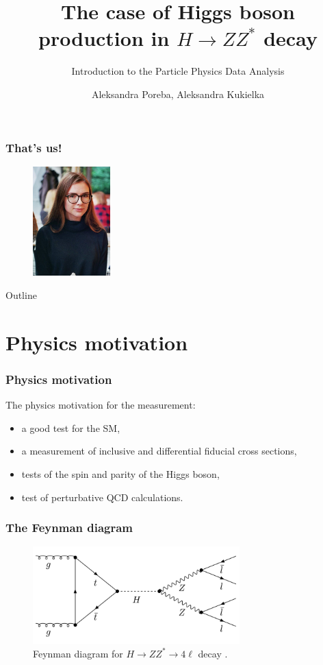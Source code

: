 \documentclass[aspectratio=1610, english]{beamer}
\author[Aleksandra Poreba, Aleksandra Kukielka]{Aleksandra Poreba, Aleksandra Kukielka}
\date{}
\title[The $H \rightarrow ZZ^{*}$ decay analysis]{The case of Higgs boson production in $H \rightarrow ZZ^{*}$ decay}
\subtitle{Introduction to the Particle Physics Data Analysis}
\newcommand{\hzz}{ H\rightarrow ZZ^{*}\rightarrow 4 \ell}
\begin{document}
\maketitle

\begin{frame}
\frametitle{That's us!}

\begin{figure} [H]
\centering
\includegraphics[width=3cm]{zdj1.png}
\end{figure}

\end{frame}

\begin{frame}{Outline}
	\tableofcontents
\end{frame}

\section{Physics motivation}

\begin{frame}
\frametitle{Physics motivation}
The physics motivation for the measurement:
\begin{itemize}
\item a good test for the SM,
\item a measurement of inclusive and differential fiducial cross sections,
\item tests of the spin and parity of the Higgs boson,
\item test of perturbative QCD calculations.
\end{itemize}

\end{frame}

\begin{frame}
\frametitle{The Feynman diagram}

\begin{figure} [H]
\centering
\includegraphics[width=8cm]{feynman_diagram.png}
\caption{Feynman diagram for $\hzz$ decay \cite{diagram}. }
\end{figure}

\end{frame}
\end{document}
